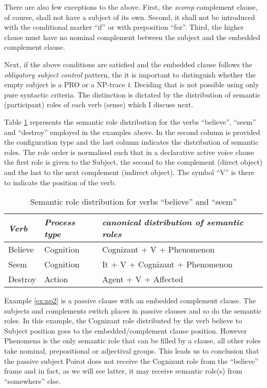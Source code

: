 There are also few exceptions to the above. First, the \textit{xcomp} complement clause, of course, shall not have a subject of its own. Second, it shall not be introduced with the conditional marker ``if'' or with preposition ``for''. Third, the higher clause must have no nominal complement between the subject and the embedded complement clause. 

Next, if the above conditions are satisfied and the embedded clause follows the \textit{obligatory subject control} pattern, the it is important to distinguish whether the empty subject is a PRO or a NP-trace \textit{t}. Deciding that is not possible using only pure syntactic criteria. The distinction is dictated by the distribution of semantic (participant) roles of each verb (sense) which I discuss next.


Table \ref{tab:srl-for-example} represents the semantic role distribution for the verbs ``believe'', ``seem'' and ``destroy'' employed in the examples above. In the second column is provided the configuration type and the last column indicates the distribution of semantic roles. The role order is normalised such that in a declarative active voice clause the first role is given to the Subject, the second to the complement (direct object) and the last to the next complement (indirect object). The symbol ``V'' is there to indicate the position of the verb. 

\begin{table}[h]
    \centering
    \begin{tabular}{|l|l|l|}
        \hline
        \textit{Verb} & \textit{Process type} & \textit{canonical distribution of semantic roles} \\ \hline
        Believe & Cognition & Cognizant + V + Phenomenon \\ \hline
        Seem & Cognition & It + V + Cognizant + Phenomenon \\ \hline
        Destroy & Action & Agent + V + Affected \\ \hline
    \end{tabular}
    \caption{Semantic role distribution for verbs ``believe'' and ``seem''}
    \label{tab:srl-for-example}
\end{table}

Example \ref{ex:np2} is a passive clause with an embedded complement clause. The subjects and complements switch places in passive clauses and so do the semantic roles. In this example, the Cognizant role distributed by the verb believe to Subject position goes to the embedded/complement clause position. However Phenomena is the only semantic role that can be filled by a clause, all other roles take nominal, prepositional or adjectival groups. This leads us to conclusion that the passive subject Poirot does not receive the Cognizant role from the ``believe'' frame and in fact, as we will see latter, it may receive  semantic role(s) from ``somewhere'' else. 

